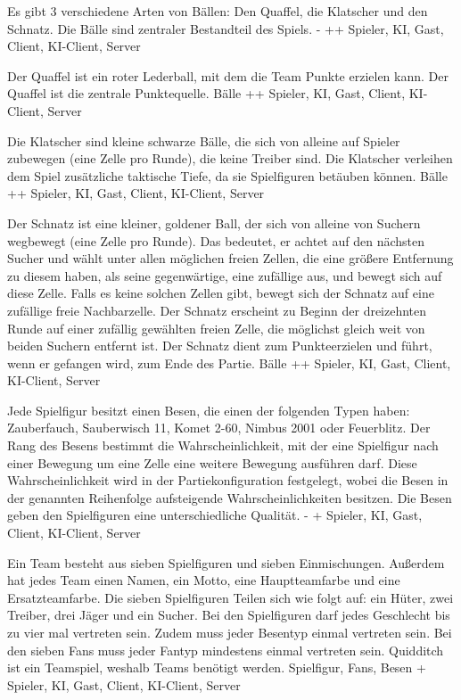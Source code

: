         {Es gibt 3 verschiedene Arten von Bällen: Den Quaffel, die Klatscher und den Schnatz.}
        {Die Bälle sind zentraler Bestandteil des Spiels.}
        {-}
        {++}
        {Spieler, KI, Gast, Client, KI-Client, Server}

        {Der Quaffel ist ein roter Lederball, mit dem die Team Punkte erzielen kann.}
        {Der Quaffel ist die zentrale Punktequelle.}
        {Bälle}
        {++}
        {Spieler, KI, Gast, Client, KI-Client, Server}

        {Die Klatscher sind kleine schwarze Bälle, die sich von alleine auf Spieler zubewegen (eine Zelle pro Runde), die keine Treiber sind.}
        {Die Klatscher verleihen dem Spiel zusätzliche taktische Tiefe, da sie Spielfiguren betäuben können.}
        {Bälle}
        {++}
        {Spieler, KI, Gast, Client, KI-Client, Server}

        {Der Schnatz ist eine kleiner, goldener Ball, der sich von alleine von Suchern wegbewegt (eine Zelle pro Runde). Das bedeutet, er achtet auf den nächsten Sucher und wählt unter allen möglichen freien Zellen, die eine größere Entfernung zu diesem haben, als seine gegenwärtige, eine zufällige aus, und bewegt sich auf diese Zelle. Falls es keine solchen Zellen gibt, bewegt sich der Schnatz auf eine zufällige freie Nachbarzelle. Der Schnatz erscheint zu Beginn der dreizehnten Runde auf einer zufällig gewählten freien Zelle, die möglichst gleich weit von beiden Suchern entfernt ist.}
        {Der Schnatz dient zum Punkteerzielen und führt, wenn er gefangen wird, zum Ende des Partie.}
        {Bälle}
        {++}
        {Spieler, KI, Gast, Client, KI-Client, Server}

        {Jede Spielfigur besitzt einen Besen, die einen der folgenden Typen haben: Zauberfauch, Sauberwisch 11, Komet 2-60, Nimbus 2001 oder Feuerblitz. Der Rang des Besens bestimmt die Wahrscheinlichkeit, mit der eine Spielfigur nach einer Bewegung um eine Zelle eine weitere Bewegung ausführen darf. Diese Wahrscheinlichkeit wird in der Partiekonfiguration festgelegt, wobei die Besen in der genannten Reihenfolge aufsteigende Wahrscheinlichkeiten besitzen.}
        {Die Besen geben den Spielfiguren eine unterschiedliche Qualität.}
        {-}
        {+}
        {Spieler, KI, Gast, Client, KI-Client, Server}
        
        {Ein Team besteht aus sieben Spielfiguren und sieben Einmischungen. Außerdem hat jedes Team einen Namen, ein Motto, eine Hauptteamfarbe und eine Ersatzteamfarbe. Die sieben Spielfiguren Teilen sich wie folgt auf:  ein Hüter, zwei Treiber, drei Jäger und ein Sucher. Bei den Spielfiguren darf jedes Geschlecht bis zu vier mal vertreten sein. Zudem muss jeder Besentyp einmal vertreten sein. Bei den sieben Fans muss jeder Fantyp mindestens einmal vertreten sein.}
        {Quidditch ist ein Teamspiel, weshalb Teams benötigt werden.}
        {Spielfigur, Fans, Besen}
        {+}
        {Spieler, KI, Gast, Client, KI-Client, Server}

